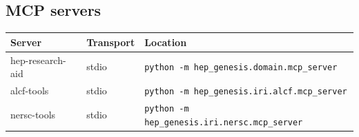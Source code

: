 \documentclass[11pt,a4paper]{article}
\begin{document}
\subsection{MCP servers}
\begin{longtable}{@{}p{}p{}p{}@{}}
\toprule Server & Transport & Location \\ \midrule \endhead
hep-research-aid & stdio & \texttt{python -m hep\_\allowbreak{}genesis.domain.mcp\_\allowbreak{}server} \\
alcf-tools & stdio & \texttt{python -m hep\_\allowbreak{}genesis.iri.alcf.mcp\_\allowbreak{}server} \\
nersc-tools & stdio & \texttt{python -m hep\_\allowbreak{}genesis.iri.nersc.mcp\_\allowbreak{}server} \\
\bottomrule\end{longtable}
\end{document}

